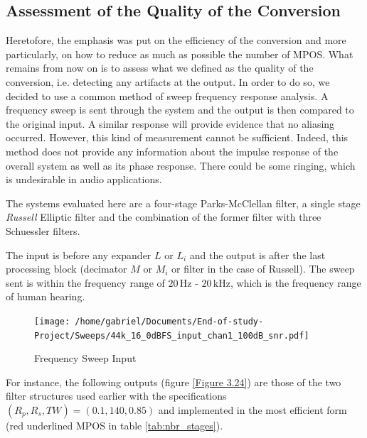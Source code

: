 \subsection{Assessment of the Quality of the Conversion}

Heretofore, the emphasis was put on the efficiency of the conversion and more particularly, on how to reduce as much as possible the number of MPOS. What remains from now on is to assess what we defined as the quality of the conversion, i.e. detecting any artifacts at the output. In order to do so, we decided to use a common method of sweep frequency response analysis. A frequency sweep is sent through the system and the output is then compared to the original input. A similar response will provide evidence that no aliasing occurred. However, this kind of measurement cannot be sufficient. Indeed, this method does not provide any information about the impulse response of the overall system as well as its phase response. There could be some ringing, which is undesirable in audio applications. 


 The systems evaluated here are a four-stage Parks-McClellan filter, a single stage \textit{Russell} Elliptic filter and the combination of the former filter with three Schuessler filters. 

The input is before any expander $L$ or $L_i$ and the output is after the last processing block (decimator $M$ or $M_i$ or filter in the case of Russell). The sweep sent is within the frequency range of $20 \, \text{Hz - } 20 \, \text{kHz}$, which is the frequency range of human hearing. \\


\begin{figure}[ht]
	\centering
	\texttt{[image: /home/gabriel/Documents/End-of-study-Project/Sweeps/44k\_16\_0dBFS\_input\_chan1\_100dB\_snr.pdf]}
	\caption{Frequency Sweep Input}\label{Figure 3.23}
\end{figure}

For instance, the following outputs (figure \ref{Figure 3.24}) are those of the two filter structures used earlier with the specifications $(R_p, R_s, TW) = (0.1, 140, 0.85)$ and implemented in the most efficient form (red underlined MPOS in table \ref{tab:nbr_stages}).

